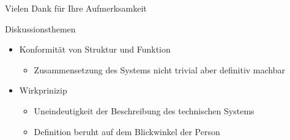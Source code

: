 \documentclass[aspectratio=169]{beamer}
\begin{document}
    \begin{frame}
        \begin{center}
            {\LARGE Vielen Dank für Ihre Aufmerksamkeit}
        \end{center}
    \end{frame}

    \begin{frame}{Diskussionsthemen}
        \begin{itemize}
            \item Konformität von Struktur und Funktion
            \begin{itemize}
                \item Zusammensetzung des Systems nicht trivial aber definitiv machbar
            \end{itemize}
            \item Wirkprinizip
            \begin{itemize}
                \item Uneindeutigkeit der Beschreibung des technischen Systems
                \item Definition beruht auf dem Blickwinkel der Person
            \end{itemize}
        \end{itemize}
    \end{frame}
\end{document}
